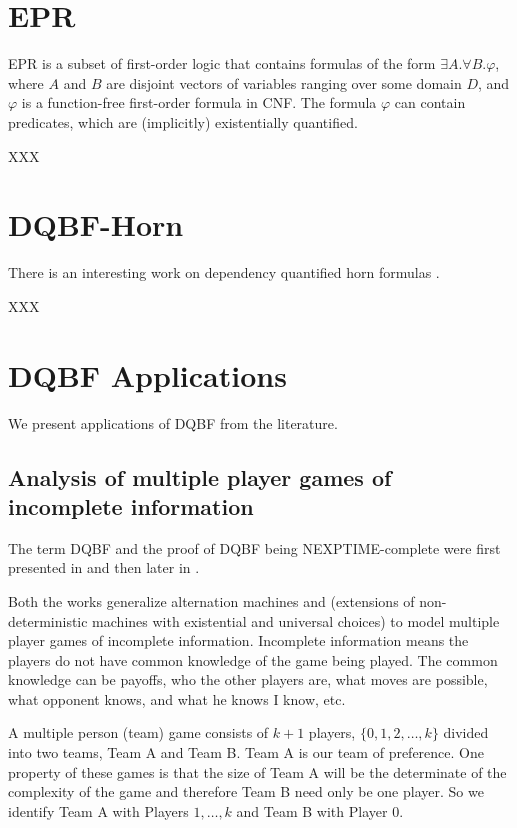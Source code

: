 \documentclass[runningheads]{llncs}
\begin{document}
\section{EPR}
EPR is a subset of first-order logic that contains formulas of the form $\exists A . \forall B . \varphi$, where $A$ and $B$ are disjoint vectors of variables ranging over some domain $D$, and $\varphi$ is a function-free first-order formula in CNF. 
The formula $\varphi$  can contain predicates, which are (implicitly) existentially quantified.

XXX\\

\section{DQBF-Horn}\label{sec:dqbf-horn}
There is an interesting work on dependency quantified horn formulas \cite{bubeckb06}.

XXX

\section{DQBF Applications}\label{sec:dqbf-applications}

We present applications of DQBF from the literature.

\subsection{Analysis of multiple player games of incomplete information}\label{subsec:multiplayer-games}

The term DQBF and the proof of DQBF being NEXPTIME-complete were first presented in \cite{peterson1979multiple} and then later in \cite{peterson2001lower}.

Both the works generalize alternation machines \cite{chandra1981lj} and \cite{fraenkel78} (extensions of non-deterministic machines with existential and universal choices) to model multiple player games of incomplete information.
Incomplete information means the players do not have common knowledge of the game being played.
The common knowledge can be payoffs, who the other players are, what moves are possible, what opponent knows, and what he knows I know, etc.

A multiple person (team) game consists of $k+1$ players, $\{0, 1,2, \dots ,k\}$ divided into two teams, Team A and Team B.
Team A is our team of preference.
One property of these games is that the size of Team A will be the determinate of the complexity of the game and therefore Team B need only be one player.
So we identify Team A with Players $1,\dots,k$ and Team B with Player 0.
\end{document}
